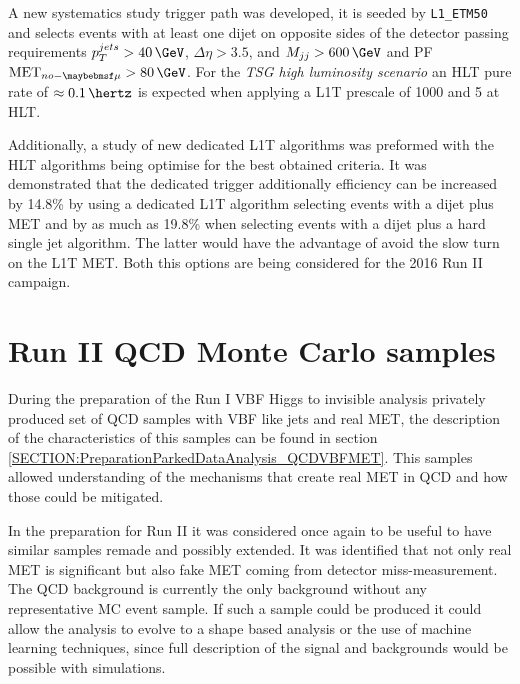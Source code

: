 A new systematics study trigger path was developed, it is seeded by \verb|L1_ETM50| and selects events with at least one dijet on opposite sides of the detector passing requirements $p_T^{jets}>40\,\GeV$, $\Delta\eta>3.5$, and $M_{jj}>600\,\GeV$ and \gls{PF} $\text{MET}_{no-\mu}>80\,\GeV$. For the \textit{\gls{TSG} high luminosity scenario} an \gls{HLT} pure rate of $\approx 0.1\,\hertz$ is expected when applying a \gls{L1T} prescale of 1000 and 5 at \gls{HLT}.

Additionally, a study of new dedicated \gls{L1T} algorithms was preformed with the \gls{HLT} algorithms being optimise for the best obtained criteria. It was demonstrated that the dedicated trigger additionally efficiency can be increased by 14.8\% by using a dedicated \gls{L1T} algorithm selecting events with a dijet plus \gls{MET} and by as much as 19.8\% when selecting events with a dijet plus a hard single jet algorithm. The latter would have the advantage of avoid the slow turn on the \gls{L1T} \gls{MET}. Both this options are being considered for the 2016 Run II campaign.

\section{Run II QCD Monte Carlo samples}
\label{SECTION:RunIIPreparation_RunIIQCDMonteCarloSamples}


During the preparation of the Run I \gls{VBF} Higgs to invisible analysis privately produced set of \gls{QCD} samples with \gls{VBF} like jets and real \gls{MET}, the description of the characteristics of this samples can be found in section \ref{SECTION:PreparationParkedDataAnalysis_QCDVBFMET}. This samples allowed understanding of the mechanisms that create real \gls{MET} in \gls{QCD} and how those could be mitigated. 

In the preparation for Run II it was considered once again to be useful to have similar samples remade and possibly extended. It was identified that not only real \gls{MET} is significant but also fake \gls{MET} coming from detector miss-measurement. The \gls{QCD} background is currently the only background without any representative \gls{MC} event sample. If such a sample could be produced it could allow the analysis to evolve to a shape based analysis or the use of machine learning techniques, since full description of the signal and backgrounds would be possible with simulations.

